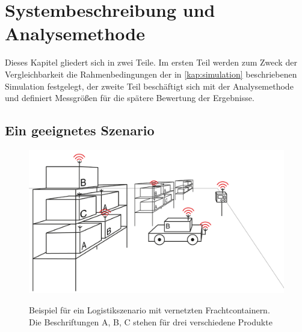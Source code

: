 \chapter{Systembeschreibung und Analysemethode}\label{kap:systembeschreibung}

Dieses Kapitel gliedert sich in zwei Teile. Im ersten Teil werden zum Zweck der Vergleichbarkeit die Rahmenbedingungen der in \autoref{kap:simulation} beschriebenen Simulation festgelegt, der zweite Teil beschäftigt sich mit der Analysemethode und definiert Messgrößen für die spätere Bewertung der Ergebnisse.

\section{Ein geeignetes Szenario}
\begin{figure}[bth]
        \myfloatalign
        {\includegraphics[width=1\linewidth]{gfx/uebersicht}} 
        \caption[Scenario]{Beispiel für ein Logistikszenario mit vernetzten Frachtcontainern. Die Beschriftungen A, B, C stehen für drei verschiedene Produkte}\label{fig:lageruebersicht}
\end{figure}
